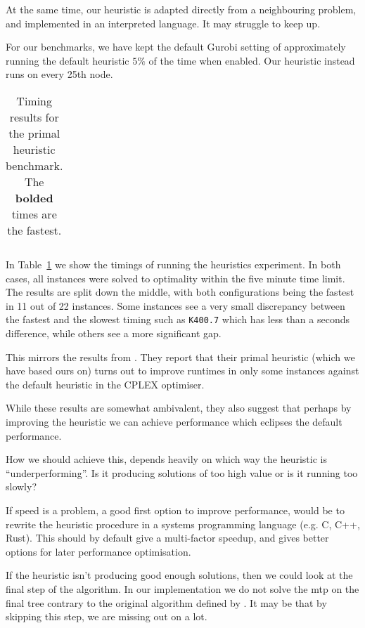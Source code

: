 At the same time, our heuristic is adapted directly from a neighbouring problem,
and implemented in an interpreted language. It may struggle to keep up.

For our benchmarks, we have kept the default Gurobi setting of approximately running
the default heuristic $5\%$ of the time when enabled. Our heuristic instead runs on
every 25th node.

\begin{table}[h!]
  \centering
  \begin{tabular}[h!]{|c|c|c|c|}\hline
    
  \end{tabular}
  \caption{Timing results for the primal heuristic benchmark. The
    \textbf{bolded} times are the fastest.}
  \label{tab:jmp:heuristics}
\end{table}

In Table~\ref{tab:jmp:heuristics} we show the timings of running the heuristics experiment.
In both cases, all instances were solved to optimality within the five minute time limit.
The results are split down the middle, with both configurations being the fastest
in 11 out of 22 instances. Some instances see a very small discrepancy between the fastest
and the slowest timing such as \texttt{K400.7} which has less than a seconds difference,
while others see a more significant gap.


This mirrors the results from
\citet{ljubic2005solving}. They report that their primal heuristic (which we have based
ours on) turns out to improve runtimes in only some instances against the default heuristic
in the CPLEX optimiser.

While these results are somewhat ambivalent,
they also suggest that perhaps by improving the heuristic we can achieve performance
which eclipses the default performance.

How we should achieve this, depends heavily on which way the heuristic is ``underperforming''.
 Is it producing solutions of too high value or is it running too slowly?

 If speed is a problem, a good first option to improve performance,
 would be to rewrite the heuristic procedure
in a systems programming language (e.g. C, C++, Rust).
This should by default give a multi-factor speedup, and gives better options for
later performance optimisation.

If the heuristic isn't producing good enough solutions, then we could look at the final step
of the algorithm. In our implementation we do not solve the \gls{mtp} on the final tree contrary
to the original algorithm defined by \citet{ljubic2005solving}. It may be that by skipping
this step, we are missing out on a lot.

